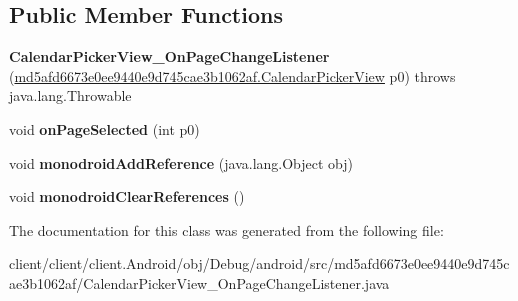 \subsection*{Public Member Functions}
\begin{DoxyCompactItemize}
\item 
\hypertarget{classmd5afd6673e0ee9440e9d745cae3b1062af_1_1CalendarPickerView__OnPageChangeListener_a8cd4f606b197df19c8f14e376b6c892c}{}{\bfseries Calendar\+Picker\+View\+\_\+\+On\+Page\+Change\+Listener} (\hyperlink{classmd5afd6673e0ee9440e9d745cae3b1062af_1_1CalendarPickerView}{md5afd6673e0ee9440e9d745cae3b1062af.\+Calendar\+Picker\+View} p0)  throws java.\+lang.\+Throwable 	\label{classmd5afd6673e0ee9440e9d745cae3b1062af_1_1CalendarPickerView__OnPageChangeListener_a8cd4f606b197df19c8f14e376b6c892c}

\item 
\hypertarget{classmd5afd6673e0ee9440e9d745cae3b1062af_1_1CalendarPickerView__OnPageChangeListener_a27b0ee9f4186bbb042ac864be70c33d3}{}void {\bfseries on\+Page\+Selected} (int p0)\label{classmd5afd6673e0ee9440e9d745cae3b1062af_1_1CalendarPickerView__OnPageChangeListener_a27b0ee9f4186bbb042ac864be70c33d3}

\item 
\hypertarget{classmd5afd6673e0ee9440e9d745cae3b1062af_1_1CalendarPickerView__OnPageChangeListener_abe4faf2ab25fc7375e20905ab2e5b01f}{}void {\bfseries monodroid\+Add\+Reference} (java.\+lang.\+Object obj)\label{classmd5afd6673e0ee9440e9d745cae3b1062af_1_1CalendarPickerView__OnPageChangeListener_abe4faf2ab25fc7375e20905ab2e5b01f}

\item 
\hypertarget{classmd5afd6673e0ee9440e9d745cae3b1062af_1_1CalendarPickerView__OnPageChangeListener_a00c10ca6da781520112aee2646e89108}{}void {\bfseries monodroid\+Clear\+References} ()\label{classmd5afd6673e0ee9440e9d745cae3b1062af_1_1CalendarPickerView__OnPageChangeListener_a00c10ca6da781520112aee2646e89108}

\end{DoxyCompactItemize}


The documentation for this class was generated from the following file\+:\begin{DoxyCompactItemize}
\item 
client/client/client.\+Android/obj/\+Debug/android/src/md5afd6673e0ee9440e9d745cae3b1062af/Calendar\+Picker\+View\+\_\+\+On\+Page\+Change\+Listener.\+java\end{DoxyCompactItemize}
